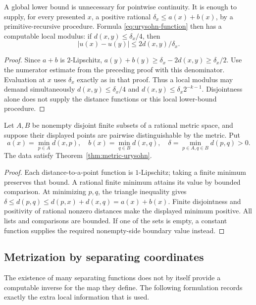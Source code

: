 \begin{proposition}
\label{prop:local-urysohn}
A global lower bound is unnecessary for pointwise continuity.  It is
enough to supply, for every presented $x$, a positive rational
$\delta_x\leq a(x)+b(x)$, by a primitive-recursive procedure.  Formula
\eqref{eq:urysohn-function} then has a computable local modulus: if
$d(x,y)\leq\delta_x/4$, then
\[
 |u(x)-u(y)|\leq 2d(x,y)/\delta_x.
\]
\end{proposition}
\begin{proof}
Since $a+b$ is $2$-Lipschitz,
$a(y)+b(y)\geq\delta_x-2d(x,y)\geq\delta_x/2$.
Use the numerator estimate from the preceding proof with this denominator.
Evaluation at $x$ uses $\delta_x$ exactly as in that proof.  Thus a
local modulus may demand simultaneously
$d(x,y)\leq\delta_x/4$ and
$d(x,y)\leq\delta_x 2^{-k-1}$.
Disjointness alone does not supply the distance functions or this local
lower-bound procedure.
\end{proof}

\begin{corollary}
\label{cor:finite-metric-urysohn}
Let $A,B$ be nonempty disjoint finite subsets of a rational metric space,
and suppose their displayed points are pairwise distinguishable by the
metric.  Put
\[
 a(x)=\min_{p\in A}d(x,p),\quad b(x)=\min_{q\in B}d(x,q),\quad
 \delta=\min_{p\in A,q\in B}d(p,q)>0.
\]
The data satisfy Theorem~\ref{thm:metric-urysohn}.
\end{corollary}
\begin{proof}
Each distance-to-a-point function is $1$-Lipschitz; taking a finite minimum
preserves that bound.  A rational finite minimum attains its value by
bounded comparison.  At minimizing $p,q$, the triangle inequality gives
$\delta\leq d(p,q)\leq d(p,x)+d(x,q)=a(x)+b(x)$.
Finite disjointness and positivity of rational nonzero distances make
the displayed minimum positive.  All lists and comparisons are bounded.
If one of the sets is empty, a constant function supplies the required
nonempty-side boundary value instead.
\end{proof}

\subsection{Metrization by separating coordinates}

The existence of many separating functions does not by itself provide
a computable inverse for the map they define.  The following formulation
records exactly the extra local information that is used.


